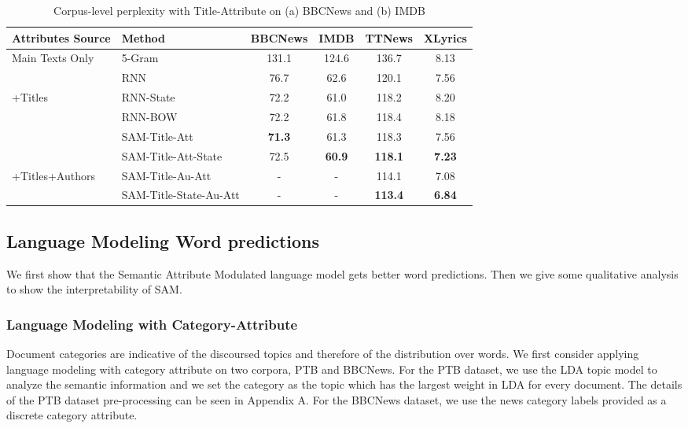\documentclass[a4paper]{article}
\newcommand{\method}{\xspace{SAM}}
\begin{document}
\begin{table*}[ht]
\vspace{-.2cm}
\caption{Corpus-level perplexity with Title-Attribute on (a) BBCNews and (b) IMDB}
\vspace{-.1cm}
\label{table:language-modeling-title}
\begin{center}
\setlength\tabcolsep{3pt}
\begin{tabular}{l|l|cccc}
\hline\hline
Attributes Source&Method& BBCNews & IMDB & TTNews& XLyrics\\
 \hline
\multirow{2}{1in}{Main Texts Only}&5-Gram&131.1&124.6 &136.7 &8.13\\
&RNN&76.7 &62.6&120.1 &7.56\\
\hline
\multirow{4}{1in}{+Titles}&RNN-State &72.2&61.0 & 118.2&8.20\\
&RNN-BOW & 72.2& 61.8& 118.4&8.18\\
&\method-Title-Att &\textbf{71.3} &61.3 &118.3 &7.56\\
&\method-Title-Att-State &72.5&\textbf{60.9}&\textbf{118.1} &\textbf{7.23}\\
\hline
\multirow{2}{1in}{+Titles+Authors}&\method-Title-Au-Att&-&-&114.1&7.08\\
&\method-Title-State-Au-Att&-&-&\textbf{113.4}&\textbf{6.84}\\
 \hline\hline
\end{tabular}
\end{center}
\vspace{-.2cm}
\end{table*}





\subsection{Language Modeling Word predictions}
We first show that the Semantic Attribute Modulated language model gets better word predictions. Then we give some qualitative analysis to show the interpretability of \method.
\subsubsection{Language Modeling with Category-Attribute}
Document categories are indicative of the discoursed topics and therefore of the distribution over words.
We first consider applying language modeling with category attribute on two corpora, PTB and BBCNews. For the PTB dataset, we use the LDA topic model to analyze the semantic information and we set the category as the topic which has the largest weight in LDA for every document. The details of the PTB dataset pre-processing can be seen in Appendix A. For the BBCNews dataset, we use the news category labels provided as a discrete category attribute.
\end{document}
